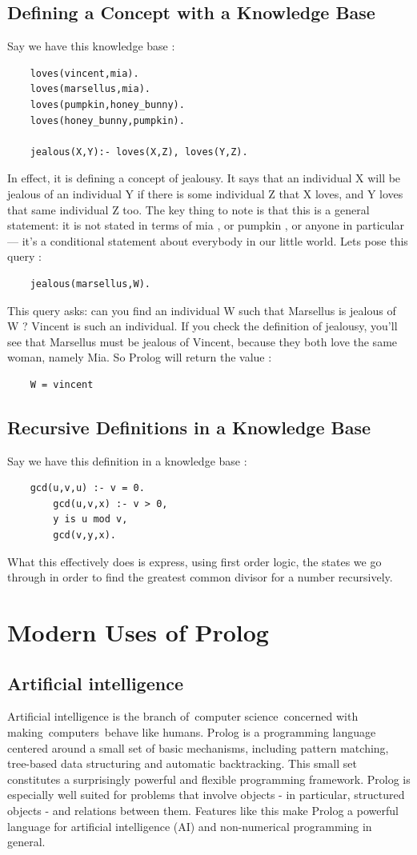 \documentclass[14pt]{article}
\begin{document}
\subsection{Defining a Concept with a Knowledge Base}
Say we have this knowledge base :
\begin{verbatim}
	loves(vincent,mia).
	loves(marsellus,mia).
	loves(pumpkin,honey_bunny).
	loves(honey_bunny,pumpkin).

	jealous(X,Y):- loves(X,Z), loves(Y,Z).
\end{verbatim}
In effect, it is defining a concept of jealousy. It says that an 
individual X will be jealous of an individual Y if there is some 
individual Z that X loves, and Y loves that same individual Z too. The 
key thing to note is that this is a general statement: it is not stated 
in terms of mia , or pumpkin , or anyone in particular — it’s a 
conditional statement about everybody in our little world. Lets pose 
this query :
\begin{verbatim}
	jealous(marsellus,W).
\end{verbatim}
This query asks: can you find an individual W such that Marsellus is 
jealous of W ? Vincent is such an individual.
If you check the definition of jealousy,
you’ll see that Marsellus must be jealous of Vincent,
because they both love the same woman, namely Mia. So Prolog will return
the value :
\begin{verbatim}
	W = vincent
\end{verbatim}
\subsection{Recursive Definitions in a Knowledge Base}
Say we have this definition in a knowledge base :
\begin{verbatim}
	gcd(u,v,u) :- v = 0.
		gcd(u,v,x) :- v > 0,
		y is u mod v,
		gcd(v,y,x).
\end{verbatim}
What this effectively does is express, using first order logic, the 
states we go through in order to find the greatest common divisor 
for a number recursively. 
\newpage
\section{Modern Uses of Prolog}
\subsection{Artificial intelligence}

Artificial intelligence is the branch of computer science concerned with
making computers behave like humans.
Prolog is a programming language centered around a small set of basic 
mechanisms, including pattern matching, tree-based data structuring and 
automatic backtracking. This small set constitutes a surprisingly 
powerful and flexible programming framework. Prolog is especially well 
suited for problems that involve objects - in particular,
structured objects - and relations between them. Features like this make
Prolog a powerful language for artificial intelligence (AI) and 
non-numerical programming in general.
\end{document}
